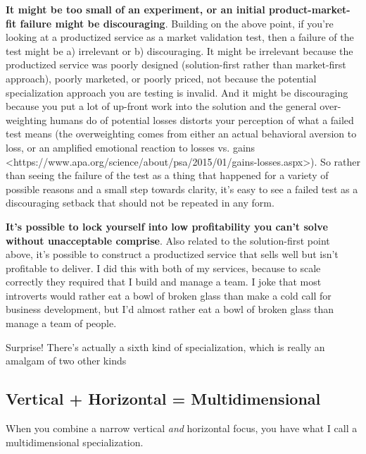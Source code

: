 \textbf{It might be too small of an experiment, or an initial product-market-fit failure might be discouraging}. Building on the above point, if you're looking at a productized service as a market validation test, then a failure of the test might be a) irrelevant or b) discouraging. It might be irrelevant because the productized service was poorly designed (solution-first rather than market-first approach), poorly marketed, or poorly priced, not because the potential specialization approach you are testing is invalid. And it might be discouraging because you put a lot of up-front work into the solution and the general over-weighting humans do of potential losses distorts your perception of what a failed test means (the overweighting comes from either an actual behavioral aversion to loss, or an amplified emotional reaction to losses vs. gains \textless{}https://www.apa.org/science/about/psa/2015/01/gains-losses.aspx\textgreater{}). So rather than seeing the failure of the test as a thing that happened for a variety of possible reasons and a small step towards clarity, it's easy to see a failed test as a discouraging setback that should not be repeated in any form.

\textbf{It's possible to lock yourself into low profitability you can't solve without unacceptable comprise}. Also related to the solution-first point above, it's possible to construct a productized service that sells well but isn't profitable to deliver. I did this with both of my services, because to scale correctly they required that I build and manage a team. I joke that most introverts would rather eat a bowl of broken glass than make a cold call for business development, but I'd almost rather eat a bowl of broken glass than manage a team of people.

Surprise! There's actually a sixth kind of specialization, which is really an amalgam of two other kinds

\subsection{Vertical + Horizontal = Multidimensional}

When you combine a narrow vertical \emph{and} horizontal focus, you have what I call a multidimensional specialization.


